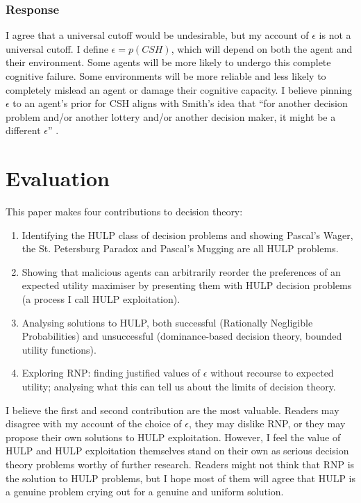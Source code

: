 \documentclass{article}
\begin{document}
\subsubsection*{Response}

I agree that a universal cutoff would be undesirable, but my account of \(\epsilon\) is not a universal cutoff. I define \(\epsilon = p(CSH)\), which will depend on both the agent and their environment. Some agents will be more likely to undergo this complete cognitive failure. Some environments will be more reliable and less likely to completely mislead an agent or damage their cognitive capacity. I believe pinning \(\epsilon\) to an agent's prior for CSH aligns with Smith's idea that ``for another decision problem and/or another lottery and/or another decision maker, it might be a different \(\epsilon\)'' \citep[pg. 472]{smith2014evaluative}.

\newpage\section{Evaluation}
This paper makes four contributions to decision theory:

\begin{enumerate}
\item Identifying the HULP class of decision problems and showing Pascal's Wager, the St. Petersburg Paradox and Pascal's Mugging are all HULP problems.
\item Showing that malicious agents can arbitrarily reorder the preferences of an expected utility maximiser by presenting them with HULP decision problems (a process I call HULP exploitation).
\item Analysing solutions to HULP, both successful (Rationally Negligible Probabilities) and unsuccessful (dominance-based decision theory, bounded utility functions).
\item Exploring RNP: finding justified values of \(\epsilon\) without recourse to expected utility; analysing what this can tell us about the limits of decision theory.
\end{enumerate}

I believe the first and second contribution are the most valuable. Readers may disagree with my account of the choice of \(\epsilon\), they may dislike RNP, or they may propose their own solutions to HULP exploitation. However, I feel the value of HULP and HULP exploitation themselves stand on their own as serious decision theory problems worthy of further research. Readers might not think that RNP is the solution to HULP problems, but I hope most of them will agree that HULP is a genuine problem crying out for a genuine and uniform solution.
\end{document}
